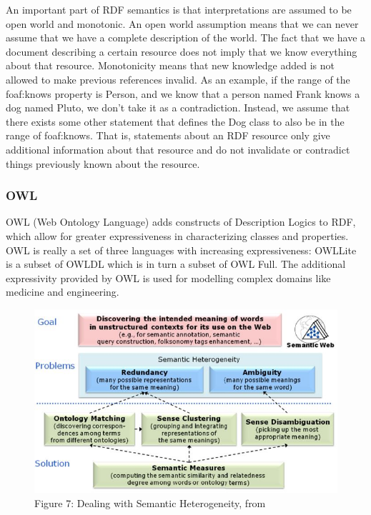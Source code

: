 \documentclass[10pt,journal,compsoc]{IEEEtran}
\begin{document}
An important part of RDF semantics is that interpretations are assumed to be open world and monotonic.  An open world assumption means that we can never assume that we have a complete description of the world.  The fact that we have a document describing a certain resource does not imply that we know everything about that resource.  Monotonicity means that new knowledge added is not allowed to make previous references invalid.  As an example, if the range of the foaf:knows property is Person, and we know that a person named Frank knows a dog named Pluto, we don’t take it as a contradiction.  Instead, we assume that there exists some other statement that defines the Dog class to also be in the range of foaf:knows.  That is, statements about an RDF resource only give additional information about that resource and do not invalidate or contradict things previously known about the resource.  

\subsubsection{OWL}
OWL (Web Ontology Language) adds constructs of Description Logics to RDF, which allow for greater expressiveness in characterizing classes and properties.  OWL is really a set of three languages with increasing expressiveness:  OWLLite is a subset of OWLDL which is in turn a subset of OWL Full.  The additional expressivity provided by OWL is used for modelling complex domains like medicine and engineering.

\begin{figure}[t]
\begin{center}
\includegraphics[width=5in]{Peter1.jpg}       
\center\caption*{Figure 7: Dealing with Semantic Heterogeneity, from \cite{gracia_dealing_2011} }
\label{fig1}
\end{center}
\end{figure}
\end{document}

